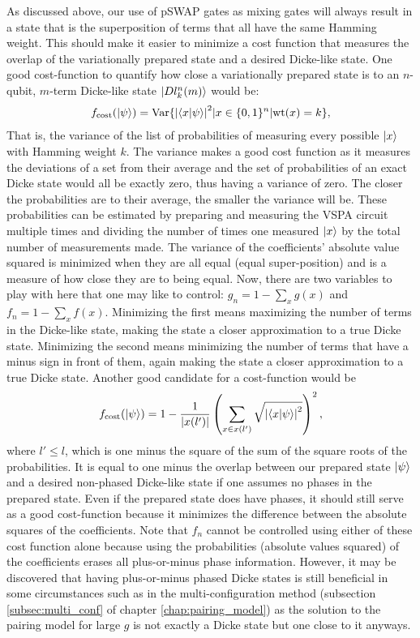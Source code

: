 \documentclass[10pt]{article}
\begin{document}
\hspace{5mm} As discussed above, our use of pSWAP gates as mixing gates will always result in a state that is the superposition of terms that all have the same Hamming weight. This should make it easier to minimize a cost function that measures the overlap of the variationally prepared state and a desired Dicke-like state. One good cost-function to quantify how close a variationally prepared state is to an $n$-qubit, $m$-term Dicke-like state $\ket{Dl^n_k(m)}$  would be:
\begin{align}
f_{\text{cost}}(\ket{\psi})=\text{Var}\{\abs{\bra{x}\ket{\psi}}^2 | x\in\{0,1\}^n | \text{wt}(x)=k \},
\end{align}     
That is, the variance of the list of probabilities of measuring every possible $\ket{x}$ with Hamming weight $k$. The variance makes a good cost function as it measures the deviations of a set from their average and the set of probabilities of an exact Dicke state would all be exactly zero, thus having a variance of zero. The closer the probabilities are to their average, the smaller the variance will be. These probabilities can be estimated by preparing and measuring the VSPA circuit multiple times and dividing the number of times one measured $\ket{x}$ by the total number of measurements made. The variance of the coefficients' absolute value squared is minimized when they are all equal (equal super-position) and is a measure of how close they are to being equal. Now, there are two variables to play with here that one may like to control: $g_n=1-\sum_xg(x)$ and $f_n=1-\sum_xf(x)$. Minimizing the first means maximizing the number of terms in the Dicke-like state, making the state a closer approximation to a true Dicke state. Minimizing the second means minimizing the number of terms that have a minus sign in front of them, again making the state a closer approximation to a true Dicke state. Another good candidate for a cost-function would be
\begin{align}
f_{\text{cost}}(\ket{\psi})=1-\frac{1}{|x(l')|}\left(\sum_{x\in x(l')}\sqrt{\abs{\bra{x}\ket{\psi}}^2}\right)^2
,\end{align}
where $l'\leq l$, which is one minus the square of the sum of the square roots of the probabilities. It is equal to one minus the overlap between our prepared state $\ket{\psi}$ and a desired non-phased Dicke-like state if one assumes no phases in the prepared state. Even if the prepared state does have phases, it should still serve as a good cost-function because it minimizes the difference between the absolute squares of the coefficients. Note that $f_n$ cannot be controlled using either of these cost function alone because using the probabilities (absolute values squared) of the coefficients erases all plus-or-minus phase information. However, it may be discovered that having plus-or-minus phased Dicke states is still beneficial in some circumstances such as in the multi-configuration method (subsection \ref{subsec:multi_conf} of chapter \ref{chap:pairing_model}) as the solution to the pairing model for large $g$ is not exactly a Dicke state but one close to it anyways.
\end{document}
